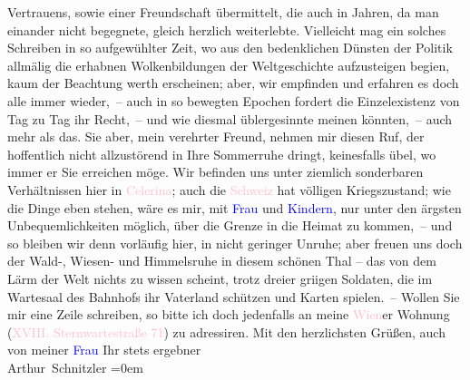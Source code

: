                     Vertrauens, sowie einer Freundschaft übermittelt, die auch in  Jahren, da man einander nicht begegnete,
                    gleich herzlich weiterlebte.\pend
           \pstart
           Vielleicht mag ein solches Schreiben in so aufgewühlter Zeit, wo aus den
                    bedenklichen Dünsten der Politik allmälig die erhabnen Wolkenbildun{\pb}gen der Weltgeschichte aufzusteigen begi{\geminationn}en, kaum der Beachtung werth erscheinen; aber,
                    wir empfinden und erfahren es doch alle immer wieder, – auch in so bewegten
                    Epochen fordert die Einzelexistenz von Tag zu Tag ihr Recht, – und wie diesmal
                    üblergesinnte meinen könnten, – auch mehr als das. Sie aber, mein verehrter
                    Freund, nehmen mir diesen Ruf, der hoffentlich nicht allzustörend in Ihre
                    Sommerruhe dringt, keinesfalls übel, wo immer er Sie erreichen möge.\pend
           \pstart
           Wir befinden uns unter ziemlich sonderbaren Verhältnissen hier in \textcolor{pink}{Celerina}{}\ledrightnote{\textcolor{pink}{Celerina}}; auch die \textcolor{pink}{Schweiz}{}\ledrightnote{\textcolor{pink}{Schweiz}} hat völligen Kriegszustand; wie die Dinge eben
                    stehen, wäre es mir, mit \textcolor{blue}{Frau}{} und \textcolor{blue}{Kindern}{}, nur unter den ärgsten {\pb}Unbequemlichkeiten möglich, über die Grenze in die Heimat zu kommen, – und so
                    bleiben wir denn vorläufig \introOben{}hier\introOben{}, in nicht geringer
                    Unruhe; aber freuen uns doch der Wald-, Wiesen- und Himmelsruhe in diesem
                    schönen Thal – das von dem Lärm der Welt nichts zu wissen scheint, trotz dreier
                        gri{\geminationm}igen Soldaten, die im Wartesaal des
                    Bahnhofs ihr Vaterland schützen und Karten spielen. –\pend
           \pstart
           Wollen Sie mir eine Zeile schreiben, so bitte ich doch jedenfalls an meine \textcolor{pink}{Wien}{}\ledrightnote{\textcolor{pink}{Wien}}er Wohnung (\textcolor{pink}{XVIII. Sternwartestraße 71}{}\ledrightnote{\textcolor{pink}{Sternwartestraße}}) zu adressiren.\pend
           \pstart
           Mit den herzlichsten Grüßen, auch von meiner \textcolor{blue}{Frau}{}\pend
           \pstart
           Ihr stets ergebner{\\[\baselineskip]}\spacefill\mbox{Arthur Schnitzler}\pend
           \leftskip=0em{}\endnumbering{}  
      